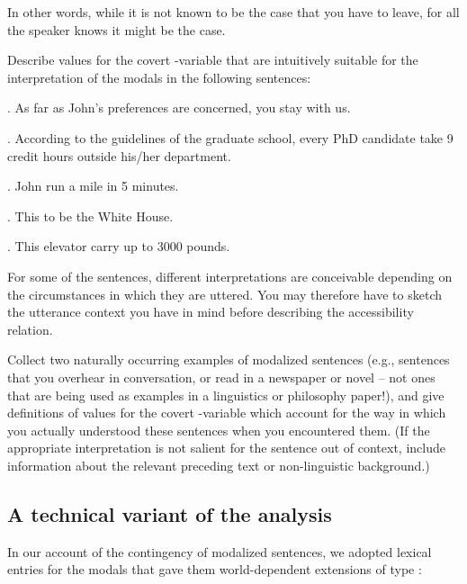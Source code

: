 In other words, while it is not known to be the case that you have to
leave, for all the speaker knows it might be the case.
\begin{exercise}
	
	Describe values for the covert -variable that are
  intuitively suitable for the interpretation of the modals in the
  following sentences:
	
	\ex. As far as John's preferences are concerned, you
   stay with us.
	
	\ex. According to the guidelines of the graduate school, every PhD
  candidate  take 9 credit hours outside his/her
  department.
	
	\ex. John  run a mile in 5 minutes.
	
	\ex. This  to be the White House.
	
	\ex. This elevator  carry up to 3000 pounds.
	
	For some of the sentences, different interpretations are conceivable
  depending on the circumstances in which they are uttered. You may
  therefore have to sketch the utterance context you have in mind
  before describing the accessibility relation. \eex
\end{exercise}
\begin{exercise}
	
	Collect two naturally occurring examples of modalized sentences
  (e.g., sentences that you overhear in conversation, or read in a
  newspaper or novel -- not ones that are being used as examples in a
  linguistics or philosophy paper!), and give definitions of values
  for the covert -variable which account for the way in
  which you actually understood these sentences when you encountered
  them. (If the appropriate interpretation is not salient for the
  sentence out of context, include information about the relevant
  preceding text or non-linguistic background.) \eex
\end{exercise}

\subsection{A technical variant of the analysis}\label{techvariant}

In our account of the contingency of modalized sentences, we adopted
lexical entries for the modals that gave them world-dependent
extensions of type :

